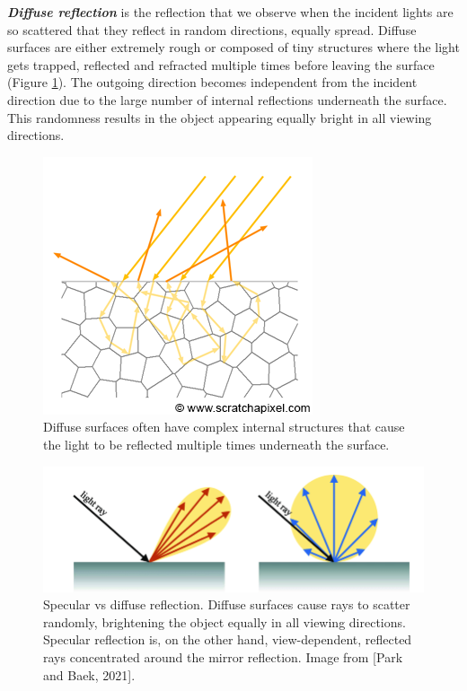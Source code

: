 

\textbf{\textit{Diffuse reflection}} is the reflection that we observe when the incident lights are so scattered that they reflect in random directions, equally spread. Diffuse surfaces are either extremely rough or composed of tiny structures where the light gets trapped, reflected and refracted multiple times before leaving the surface (Figure \ref{fig:diffuse-scattering}). The outgoing direction becomes independent from the incident direction due to the large number of internal reflections underneath the surface. This randomness results in the object appearing equally bright in all viewing directions. 

\begin{figure}
  \centering
   \includegraphics[width=0.5\linewidth]{Images/shad-diffuse1.png}
   \caption{Diffuse surfaces often have complex internal structures that cause the light to be reflected multiple times underneath the surface.}
   \label{fig:diffuse-scattering}
\end{figure}


\begin{figure}[ht]
  \centering
   \includegraphics[width=\linewidth]{Images/Differences-between-the-specular-and-diffuse-reflections-specuclar-reflections-occur-on.png}
   \caption{Specular vs diffuse reflection. Diffuse surfaces cause rays to scatter randomly, brightening the object equally in all viewing directions. Specular reflection is, on the other hand, view-dependent, reflected rays concentrated around the mirror reflection. Image from [Park and Baek, 2021].}
   \label{fig:specularvsdiffuse}
\end{figure}

